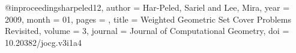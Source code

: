 @inproceedings{harpeled12,
	author = {Har-Peled, Sariel and Lee, Mira},
	year = {2009},
	month = {01},
	pages = {},
	title = {Weighted Geometric Set Cover Problems Revisited},
	volume = {3},
	journal = {Journal of Computational Geometry},
	doi = {10.20382/jocg.v3i1a4}
}
